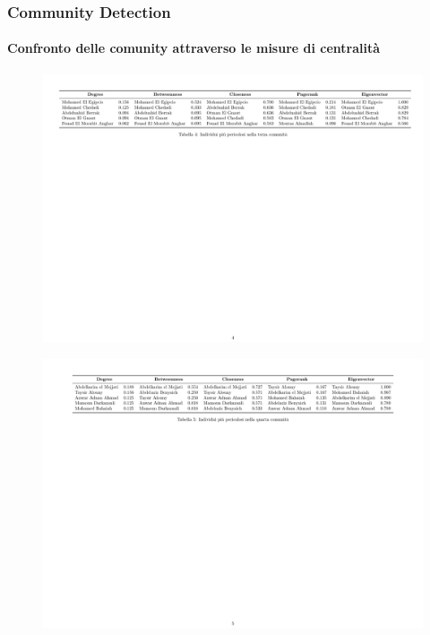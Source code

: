 \documentclass[hyperref={pdfpagelabels=false}]{beamer}
\begin{document}
\begin{frame}
\frametitle{Community Detection}
\framesubtitle{Confronto delle comunity attraverso le misure di centralità}
\begin{figure}
  \centering
    \includegraphics[width=1\textwidth]{images/provaC3.pdf}
\end{figure}
\begin{figure}
  \centering
      \includegraphics[width=1\textwidth]{images/provaC4.pdf}%
\end{figure}
\end{frame}

\end{document}
